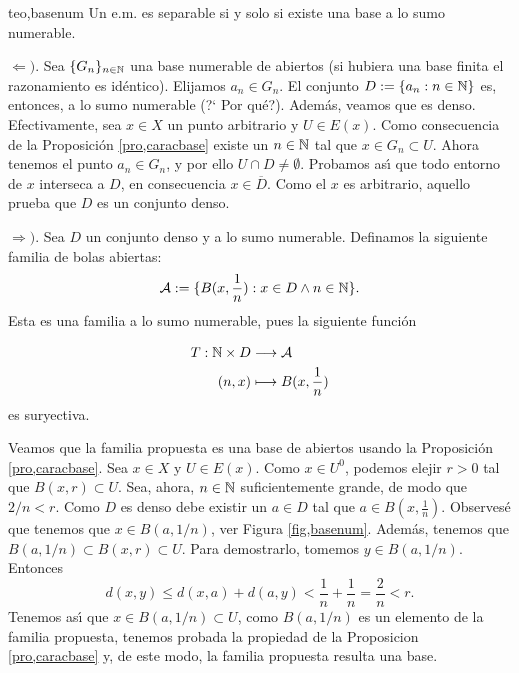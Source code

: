\begin{teorema}{teo,basenum} Un e.m. es separable si y solo si existe una base
a lo sumo numerable.
\end{teorema}
\begin{demo}$\Leftarrow )$. Sea $\{G_n\}_{n\in\mathbb{N}}$ una base numerable de
abiertos (si hubiera una base finita el razonamiento es
idéntico). Elijamos $a_n\in G_n$. El conjunto
$D:=\{a_n:n\in\mathbb{N}\}$ es, entonces, a lo sumo numerable (?` Por
qué?). Además, veamos que es denso. Efectivamente, sea $x\in
X$ un punto arbitrario y $U\in E(x)$. Como consecuencia de la
Proposición \vref{pro,caracbase} existe un $n\in\mathbb{N}$ tal que
$x\in G_n\subset U$. Ahora tenemos el punto $a_n\in G_n$, y por
ello $U\cap D\neq\emptyset$. Probamos as\'{\i} que todo entorno de
$x$ interseca a $D$, en consecuencia $x\in \overline{D}$. Como el
$x$ es arbitrario, aquello prueba que $D$ es un conjunto denso.


$\Rightarrow )$. Sea $D$ un conjunto denso y a lo sumo numerable.
Definamos la siguiente familia de bolas abiertas:
\[
   \mathcal{A}:= \{B(x,\frac1n):x\in D \wedge n\in\mathbb{N}\}.
\]
Esta es una familia a lo sumo numerable, pues la siguiente
función

\begin{eqnarray}
    T:\mathbb{N}\times D&\longrightarrow\mathcal{A}\nonumber \\
    (n,x)&\longmapsto B(x,\frac1n)\nonumber \\
\end{eqnarray}
es suryectiva.


Veamos que la familia propuesta es una base de abiertos usando la
Proposición \vref{pro,caracbase}. Sea $x\in X$ y $U\in E(x)$.
Como $x\in U^0$, podemos elejir $r>0$ tal que $B(x,r)\subset U$.
Sea, ahora, $n\in\mathbb{N}$ suficientemente grande, de modo que $2/n<r$.
Como $D$ es denso debe existir un $a\in D$ tal que $a\in
B(x,\frac1n)$. Observesé que tenemos que $x\in B(a,1/n)$, ver
Figura \ref{fig,basenum}. Además, tenemos que $B(a,1/n)\subset
B(x,r)\subset U$. Para demostrarlo, tomemos $y\in B(a,1/n)$.
Entonces
\[
    d(x,y)\leq d(x,a)+d(a,y)<\frac1n+\frac1n=\frac2n<r.
\]
Tenemos as\'{\i} que $x\in B(a,1/n)\subset U$, como $B(a,1/n)$ es
un elemento de la familia propuesta, tenemos probada la propiedad
de la Proposicion \vref{pro,caracbase} y, de este modo, la familia
propuesta resulta una base.
\end{demo}

